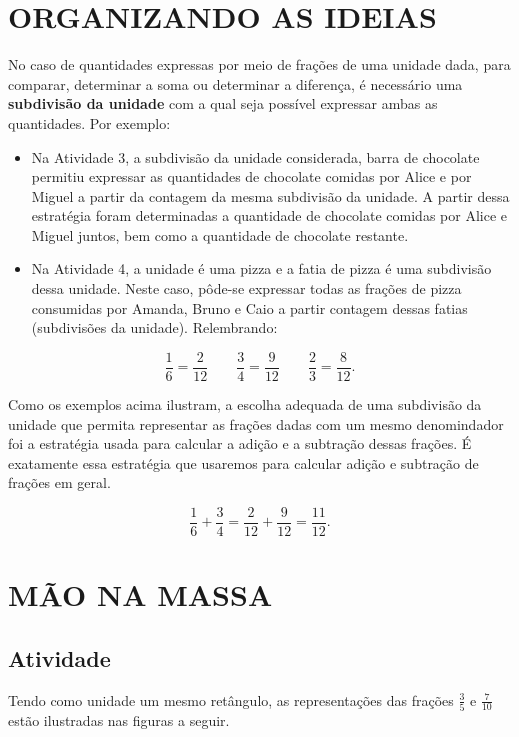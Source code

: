 \section{ORGANIZANDO AS IDEIAS }

No caso de quantidades expressas por meio de frações de uma unidade dada, para comparar, determinar a soma ou determinar a diferença, é necessário uma {\bf subdivisão da unidade} com a qual seja possível expressar ambas as quantidades. Por exemplo:
\begin{itemize} %
  \item     Na Atividade 3, a subdivisão da unidade considerada, barra de chocolate permitiu expressar as quantidades de chocolate comidas por Alice e por Miguel a partir da contagem da mesma subdivisão da unidade. A partir dessa estratégia foram determinadas a quantidade de chocolate comidas por Alice e Miguel juntos, bem como a quantidade de chocolate restante. 
  \item     Na Atividade 4, a unidade é uma pizza e a fatia de pizza é uma subdivisão dessa unidade. Neste caso, pôde-se expressar todas as frações de pizza consumidas por Amanda, Bruno e Caio a partir contagem dessas fatias (subdivisões da unidade). Relembrando:
\end{itemize} %

$$\dfrac{1}{6} = \dfrac{2}{12} 	\quad \quad \dfrac{3}{4} = \dfrac{9}{12} \quad \quad \dfrac{2}{3} = \dfrac{8}{12}.$$


Como os exemplos acima ilustram, a escolha adequada de uma subdivisão da unidade que permita representar as frações dadas com um mesmo denomindador foi a estratégia usada para calcular a adição e a subtração dessas frações. É exatamente essa estratégia que usaremos para calcular adição e subtração de frações em geral. 

$$\dfrac{1}{6} + \dfrac{3}{4} = \dfrac{2}{12} + \dfrac{9}{12} = \dfrac{11}{12}.$$


\section{MÃO NA MASSA }

\subsection{Atividade}

Tendo como unidade um mesmo retângulo, as representações das frações $\frac{3}{5}$ e $\frac{7}{10}$ estão ilustradas nas figuras a seguir. 

